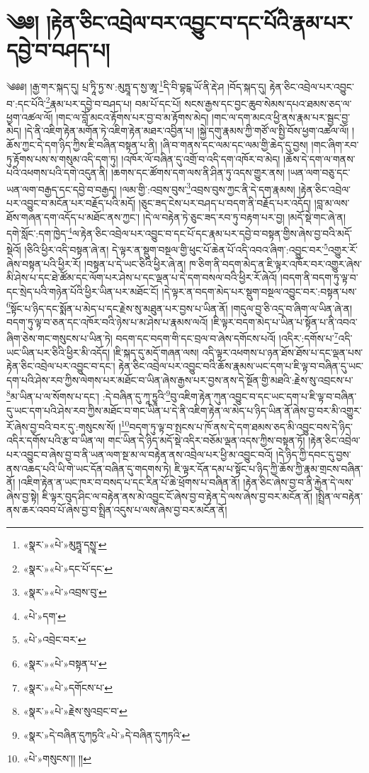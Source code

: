 \chapter{༄༅། །རྟེན་ཅིང་འབྲེལ་བར་འབྱུང་བ་དང་པོའི་རྣམ་པར་དབྱེ་བ་བཤད་པ།}༄༅༅། །རྒྱ་གར་སྐད་དུ། པྲ་ཏཱི་ཏྱ་ས་:མུཏྤཱ་ད་སྱ་ཨཱ་\footnote{«སྣར་»«པེ་»མུཏྤཱ་དསྱཱ་}དི་བི་བྷངྒ་ཡོ་ནི་རྡེ་ཤ །བོད་སྐད་དུ། རྟེན་ཅིང་འབྲེལ་པར་འབྱུང་བ་:དང་པོའི་\footnote{«སྣར་»«པེ་»དང་པོ་དང་}རྣམ་པར་དབྱེ་བ་བཤད་པ། བམ་པོ་དང་པོ། སངས་རྒྱས་དང་བྱང་ཆུབ་སེམས་དཔའ་ཐམས་ཅད་ལ་ཕྱག་འཚལ་ལོ། །གང་ལ་བློ་མངའ་རྟོགས་པར་བྱ་བ་མ་རྟོགས་མེད། །གང་ལ་དག་མངའ་ཕྱི་ནས་རྣམ་པར་སྦྱང་བྱ་མེད། །དེ་ནི་འཇིག་རྟེན་མགོན་ཏེ་འཇིག་རྟེན་མཐར་འབྱིན་པ། །སྐྱེ་དགུ་རྣམས་ཀྱི་གཙོ་ལ་སྤྱི་བོས་ཕྱག་འཚལ་ལོ། །ཆོས་ཀྱང་དེ་དག་ཉིད་ཀྱིས་ཇི་བཞིན་བསྟན་པ་ནི། །ཞི་བ་གནས་དང་ལམ་དང་ལམ་གྱི་ཆེད་དུ་བྱས། །གང་ཞིག་རབ་ཏུ་རྟོགས་པས་ས་གསུམ་འདི་དག་ཏུ། །འཁོར་ལོ་བཞིན་དུ་འགྲོ་བ་འདི་དག་འཁོར་བ་མེད། །ཆོས་དེ་དག་ལ་གནས་པའི་འཕགས་པའི་དགེ་འདུན་ནི། །ཆགས་དང་ཚོགས་དག་ལས་ནི་ཤིན་ཏུ་འདས་གྱུར་ནས། །ཡན་ལག་བཅུ་དང་ཡན་ལག་བརྒྱད་དང་དབྱེ་བ་བརྒྱད། །ལམ་གྱི་:འབྲས་བུས་\footnote{«སྣར་»«པེ་»འབྲས་བུ་}འབྲས་བུས་ཀྱང་ནི་དེ་དག་རྣམས། །རྟེན་ཅིང་འབྲེལ་པར་འབྱུང་བ་མངོན་པར་བརྗོད་པའི་མདོ། །ཅུང་ཟད་ངེས་པར་བཤད་པ་བདག་ནི་བརྗོད་པར་འདོད། །བླ་མ་ལས་ཐོས་གཞན་དག་འདོད་པ་མཐོང་ནས་ཀྱང་། །དེ་ལ་བརྟེན་ཏེ་ཅུང་ཟད་རབ་ཏུ་བརྟག་པར་བྱ། །མདོ་སྡེ་གང་ཞེ་ན། དགེ་སློང་:དག་ཁྱེད་\footnote{«པེ་»དག་}ལ་རྟེན་ཅིང་འབྲེལ་པར་འབྱུང་བ་དང་པོ་དང་རྣམ་པར་དབྱེ་བ་བསྟན་གྱིས་ཞེས་བྱ་བའི་མདོ་སྡེའོ། །ཅིའི་ཕྱིར་འདི་བསྟན་ཞེ་ན། དེ་ལྟར་ན་སྡུག་བསྔལ་གྱི་ཕུང་པོ་ཆེན་པོ་འདི་འབའ་ཞིག་:འབྱུང་བར་\footnote{«པེ་»འབྲེང་བར་}འགྱུར་རོ་ཞེས་བསྟན་པའི་ཕྱིར་རོ། །བསྟན་པ་དེ་ཡང་ཅིའི་ཕྱིར་ཞེ་ན། ཁ་ཅིག་ནི་བདག་མེད་ན་ཇི་ལྟར་འཁོར་བར་འགྱུར་ཞེས་མི་ཤེས་པ་དང་ཐེ་ཚོམ་དང་ལོག་པར་ཤེས་པ་དང་ལྡན་པ་དེ་དག་བསལ་བའི་ཕྱིར་རོ་ཞེའོ། །བདག་ནི་བདག་ཏུ་ལྟ་བ་དང་སྲེད་པའི་གཉེན་པོའི་ཕྱིར་ཡིན་པར་མཐོང་ངོ། །དེ་ལྟར་ན་བདག་མེད་པར་སྡུག་བསྔལ་འབྱུང་བར་:བསྟན་པས་\footnote{«སྣར་»«པེ་»བསྟན་པ་}སྟོང་པ་ཉིད་དང་སྨོན་པ་མེད་པ་དང་རྗེས་སུ་མཐུན་པར་བྱས་པ་ཡིན་ནོ། །གདུལ་བྱ་ཅི་འདྲ་བ་ཞིག་ལ་ཡིན་ཞེ་ན། བདག་ཏུ་ལྟ་བ་ཅན་དང་འཁོར་བའི་ཉེས་པ་མ་ཤེས་པ་རྣམས་ལའོ། །ཇི་ལྟར་བདག་མེད་པ་ཡིན་པ་སྟོན་པ་ནི་འབའ་ཞིག་ཅེས་གང་གསུངས་པ་ཡིན་ཏེ། བདག་དང་བདག་གི་དང་བྲལ་བ་ཞེས་དགོངས་པའོ། །འདིར་:དགོས་པ་\footnote{«སྣར་»«པེ་»དགོངས་པ་}འདི་ཡང་ཡིན་པར་ཅིའི་ཕྱིར་མི་འདོད། །ཇི་སྐད་དུ་མདོ་གཞན་ལས། འདི་ལྟར་འཕགས་པ་ཉན་ཐོས་ཐོས་པ་དང་ལྡན་པས་རྟེན་ཅིང་འབྲེལ་པར་འབྱུང་བ་དང་། རྟེན་ཅིང་འབྲེལ་པར་འབྱུང་བའི་ཆོས་རྣམས་ཡང་དག་པ་ཇི་ལྟ་བ་བཞིན་དུ་ཡང་དག་པའི་ཤེས་རབ་ཀྱིས་ལེགས་པར་མཐོང་བ་ཡིན་ཞེས་རྒྱས་པར་བྱས་ནས་དེ་སྔོན་གྱི་མཐའི་:རྗེས་སུ་འབྲངས་པ་\footnote{«སྣར་»«པེ་»རྗེས་སུའབྲང་བ་}མ་ཡིན་པ་ལ་སོགས་པ་དང་། :དེ་བཞིན་དུ་ཀཱ་ཏྱཱའི་\footnote{«སྣར་»དེ་བཞིན་དུཀཏྱའི་«པེ་»དེ་བཞིན་དུཀཏའི་}བུ་འཇིག་རྟེན་ཀུན་འབྱུང་བ་དང་ཡང་དག་པ་ཇི་ལྟ་བ་བཞིན་དུ་ཡང་དག་པའི་ཤེས་རབ་ཀྱིས་མཐོང་བ་གང་ཡིན་པ་དེ་ནི་འཇིག་རྟེན་ལ་མེད་པ་ཉིད་ཡིན་ནོ་ཞེས་བྱ་བར་མི་འགྱུར་རོ་ཞེས་བྱ་བའི་བར་དུ་:གསུངས་སོ། །\footnote{«པེ་»གསུངས་།། །།}བདག་ཏུ་ལྟ་བ་སྤངས་པ་ཁོ་ནས་དེ་དག་ཐམས་ཅད་མི་འབྱུང་བས་དེ་ཉིད་འདིར་དགོས་པའི་རྩ་བ་ཡིན་ལ། གང་ཡིན་དེ་ཉིད་མདོ་སྡེ་འདིར་བཅོམ་ལྡན་འདས་ཀྱིས་བསྟན་ཏོ། །རྟེན་ཅིང་འབྲེལ་པར་འབྱུང་བ་ཞེས་བྱ་བ་ནི་ཡན་ལག་སྔ་མ་ལ་བརྟེན་ནས་འབྲེལ་པར་ཕྱི་མ་འབྱུང་བའོ། །དེ་ཉིད་ཀྱི་དབང་དུ་བྱས་ནས་འཆད་པའི་ཡི་གེ་ཡང་དོན་བཞིན་དུ་གདགས་ཏེ། ཇི་ལྟར་དོན་དམ་པ་སྟོང་པ་ཉིད་ཀྱི་ཆོས་ཀྱི་རྣམ་གྲངས་བཞིན་ནོ། །འཇིག་རྟེན་ན་ཡང་ཁར་བ་བསད་པ་དང་རིན་པོ་ཆེ་ཕྲོགས་པ་བཞིན་ནོ། །རྟེན་ཅིང་ཞེས་བྱ་བ་ནི་རྐྱེན་དེ་ལས་ཞེས་བྱ་སྟེ། ཇི་ལྟར་བུད་ཤིང་ལ་བརྟེན་ནས་མེ་འབྱུང་ངོ་ཞེས་བྱ་བ་རྟེན་དེ་ལས་ཞེས་བྱ་བར་མངོན་ནོ། །སྤྲིན་ལ་བརྟེན་ནས་ཆར་འབབ་པོ་ཞེས་བྱ་བ་སྤྲིན་འདུས་པ་ལས་ཞེས་བྱ་བར་མངོན་ནོ། 
